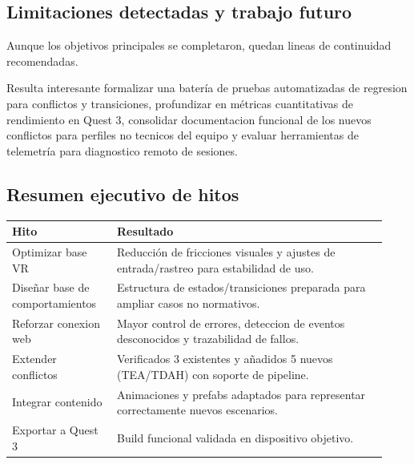 \subsection{Limitaciones detectadas y trabajo futuro}
Aunque los objetivos principales se completaron, quedan lineas de continuidad recomendadas.\par

Resulta interesante formalizar una batería de pruebas automatizadas de regresion para conflictos y transiciones, profundizar en métricas cuantitativas de rendimiento en Quest 3, consolidar documentacion funcional de los nuevos conflictos para perfiles no tecnicos del equipo y evaluar herramientas de telemetría para diagnostico remoto de sesiones.

\subsection{Resumen ejecutivo de hitos}
\begin{center}
\begin{tabular}{p{0.26\linewidth} p{0.67\linewidth}}
\toprule
\textbf{Hito} & \textbf{Resultado} \\
\midrule
Optimizar base VR               & Reducción de fricciones visuales y ajustes de entrada/rastreo para estabilidad de uso. \\
Diseñar base de comportamientos & Estructura de estados/transiciones preparada para ampliar casos no normativos. \\
Reforzar conexion web           & Mayor control de errores, deteccion de eventos desconocidos y trazabilidad de fallos. \\
Extender conflictos             & Verificados 3 existentes y añadidos 5 nuevos (TEA/TDAH) con soporte de pipeline. \\
Integrar contenido              & Animaciones y prefabs adaptados para representar correctamente nuevos escenarios. \\
Exportar a Quest 3              & Build funcional validada en dispositivo objetivo. \\
\bottomrule
\end{tabular}
\end{center}